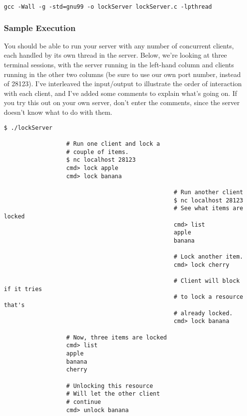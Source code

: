 \documentclass{article}
\begin{document}
\begin{enumerate}
\begin{verbatim}
gcc -Wall -g -std=gnu99 -o lockServer lockServer.c -lpthread
\end{verbatim}

\subsubsection*{Sample Execution}

  You should be able to run your server with any number of concurrent
  clients, each handled by its own thread in the server.  Below, we're
  looking at three terminal sessions, with the server running in the
  left-hand column and clients running in the other two columns (be
  sure to use our own port number, instead of 28123).  I've
  interleaved the input/output to illustrate the order of interaction
  with each client, and I've added some comments to explain what's
  going on.  If you try this out on your own server, don't enter the
  comments, since the server doesn't know what to do with them.

\begin{verbatim}
$ ./lockServer

                  # Run one client and lock a
                  # couple of items.
                  $ nc localhost 28123
                  cmd> lock apple
                  cmd> lock banana

                                                 # Run another client
                                                 $ nc localhost 28123
                                                 # See what items are locked
                                                 cmd> list
                                                 apple
                                                 banana

                                                 # Lock another item.
                                                 cmd> lock cherry

                                                 # Client will block if it tries
                                                 # to lock a resource that's
                                                 # already locked.
                                                 cmd> lock banana

                  # Now, three items are locked
                  cmd> list        
                  apple
                  banana
                  cherry

                  # Unlocking this resource
                  # Will let the other client
                  # continue
                  cmd> unlock banana


\end{verbatim}
\end{enumerate}
\end{document}
